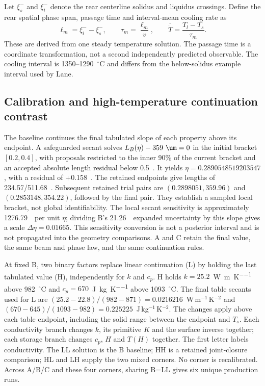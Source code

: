 Let $\xi_s^-$ and $\xi_l^-$ denote the rear centerline solidus and liquidus crossings. Define the rear spatial phase span, passage time and interval-mean cooling rate as
\begin{equation}
 \ell_m=\xi_l^- -\xi_s^-,\qquad
 \tau_m=\frac{\ell_m}{v},\qquad
 \overline{\dot T}=\frac{T_l-T_s}{\tau_m}.
 \label{eq:passage}
\end{equation}
These are derived from one steady temperature solution. The passage time is a coordinate transformation, not a second independently predicted observable. The cooling interval is 1350--1290~$^\circ$C and differs from the below-solidus example interval used by Lane.

\subsection{Calibration and high-temperature continuation contrast}
The baseline continues the final tabulated slope of each property above its endpoint. A safeguarded secant solves $L_B(\eta)-359~\um=0$ in the initial bracket $[0.2,0.4]$, with proposals restricted to the inner 90\% of the current bracket and an accepted absolute length residual below 0.5~\um. It yields $\eta=0.2890548519203547$, with a residual of +0.158~\um. The retained endpoints give lengths of 234.57/511.68~\um. Subsequent retained trial pairs are $(0.2898051,359.96)$ and $(0.2853148,354.22)$, followed by the final pair. They establish a sampled local bracket, not global identifiability. The local secant sensitivity is approximately 1276.79~\um\ per unit $\eta$; dividing B's 21.26~\um\ expanded uncertainty by this slope gives a scale $\Delta\eta=0.01665$. This sensitivity conversion is not a posterior interval and is not propagated into the geometry comparisons. A and C retain the final value, the same beam and phase law, and the same continuation rules.

At fixed B, two binary factors replace linear continuation (L) by holding the last tabulated value (H), independently for $k$ and $c_p$. H holds $k=25.2$~\si{\watt\per\metre\per\kelvin} above 982~$^\circ$C and $c_p=670$~\si{\joule\per\kilogram\per\kelvin} above 1093~$^\circ$C. The final table secants used for L are $(25.2-22.8)/(982-871)=0.0216216$~W\,m$^{-1}$\,K$^{-2}$ and $(670-645)/(1093-982)=0.225225$~J\,kg$^{-1}$\,K$^{-2}$. The changes apply above each table endpoint, including the solid range between the endpoint and $T_s$. Each conductivity branch changes $k$, its primitive $K$ and the surface inverse together; each storage branch changes $c_p$, $H$ and $T(H)$ together. The first letter labels conductivity. The LL solution is the B baseline; HH is a retained joint-closure comparison; HL and LH supply the two mixed corners. No corner is recalibrated. Across A/B/C and these four corners, sharing B=LL gives six unique production runs.

